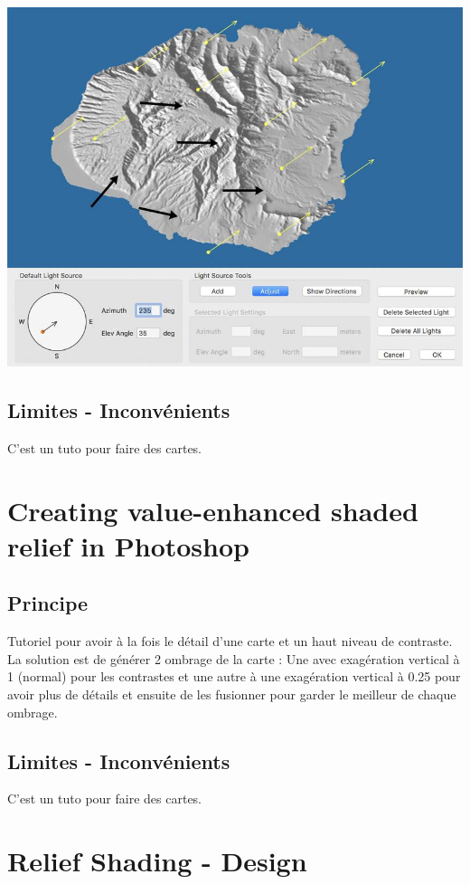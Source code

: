 \documentclass[a4paper]{article}
\begin{document}
\begin{center}
\includegraphics[scale=0.5]{multiple_light.jpeg}
\end{center}


\subsection{Limites - Inconvénients}
C'est un tuto pour faire des cartes.


\section{Creating value-enhanced shaded relief in Photoshop}
\subsection{Principe}
Tutoriel pour avoir à la fois le détail d'une carte et un haut niveau de contraste. 
La solution est de générer 2 ombrage de la carte : Une avec exagération vertical à 1 (normal) pour les contrastes et une autre à une exagération vertical à 0.25 pour avoir plus de détails et ensuite de les fusionner pour garder le meilleur de chaque ombrage.   

\subsection{Limites - Inconvénients}
C'est un tuto pour faire des cartes.

\section{Relief Shading - Design }
\end{document}
